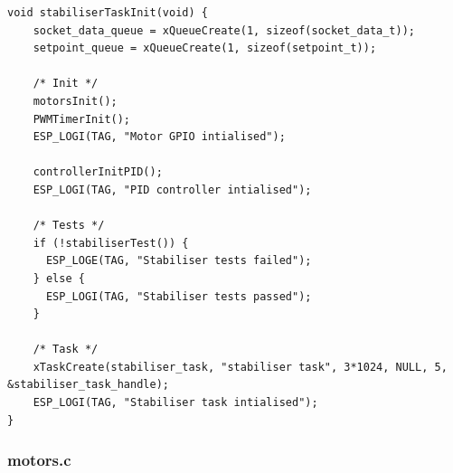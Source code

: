 \begin{lstlisting}[caption={stabiliser.c}]
void stabiliserTaskInit(void) {
    socket_data_queue = xQueueCreate(1, sizeof(socket_data_t));
    setpoint_queue = xQueueCreate(1, sizeof(setpoint_t));

    /* Init */
    motorsInit();
    PWMTimerInit();
    ESP_LOGI(TAG, "Motor GPIO intialised");

    controllerInitPID();
    ESP_LOGI(TAG, "PID controller intialised");

    /* Tests */
    if (!stabiliserTest()) {
      ESP_LOGE(TAG, "Stabiliser tests failed");
    } else {
      ESP_LOGI(TAG, "Stabiliser tests passed");
    }

    /* Task */
    xTaskCreate(stabiliser_task, "stabiliser task", 3*1024, NULL, 5, &stabiliser_task_handle);
    ESP_LOGI(TAG, "Stabiliser task intialised");
}

\end{lstlisting}


\subsubsection{motors.c}

